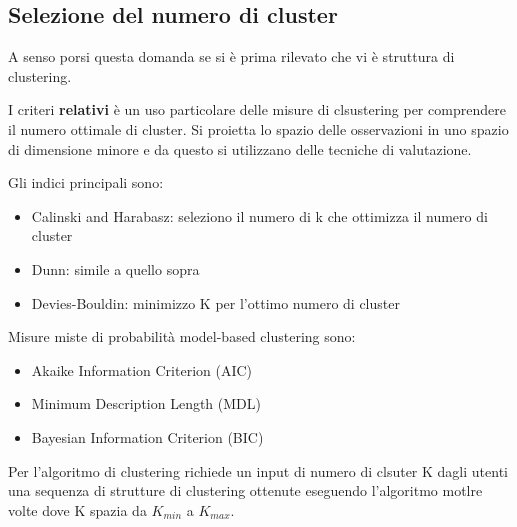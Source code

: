 \subsection{Selezione del numero di cluster}
A senso porsi questa domanda se si \`e prima rilevato che vi \`e struttura di clustering. 

I criteri \textbf{relativi} \`e un uso particolare delle misure di clsustering per comprendere il numero ottimale di cluster. Si proietta lo spazio delle osservazioni in uno spazio di dimensione minore e da questo si utilizzano delle tecniche di valutazione.

Gli indici principali sono:
\begin{itemize}
	\item Calinski and Harabasz: seleziono il numero di k che ottimizza il numero di cluster
	\item Dunn: simile a quello sopra
	\item Devies-Bouldin: minimizzo K per l'ottimo numero di cluster
\end{itemize}

Misure miste di probabilit\`a model-based clustering sono:
\begin{itemize}
	\item Akaike Information Criterion (AIC)
	\item Minimum Description Length (MDL)
	\item Bayesian Information Criterion (BIC)
\end{itemize}

Per l'algoritmo di clustering richiede un input di numero di clsuter K dagli utenti una sequenza di strutture di clustering ottenute eseguendo l'algoritmo motlre volte dove K spazia da $K_{min}$ a $K_{max}$.
